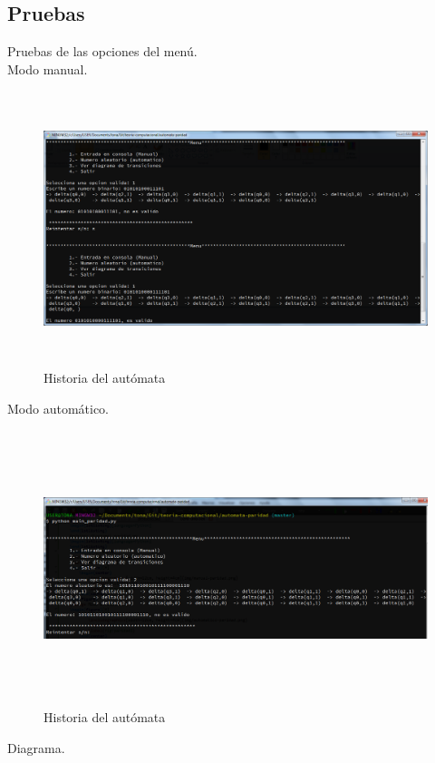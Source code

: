	\subsection{Pruebas}
	Pruebas de las opciones del menú.
	\\{\large Modo manual.}
	\begin{figure}[H]
		\begin{center}
			\includegraphics[width=\linewidth, height=8cm]{img/manual-paridad.png}
			\caption{Historia del autómata}
			\label{fig:paridad2}
		\end{center}
	\end{figure}
	{\large Modo automático.}
	\begin{figure}[H]
		\begin{center}
			\includegraphics[width=\linewidth, height=8cm]{img/automatico-paridad.png}
			\caption{Historia del autómata}
			\label{fig:paridad1}
		\end{center}
	\end{figure}
	{\large Diagrama.}
